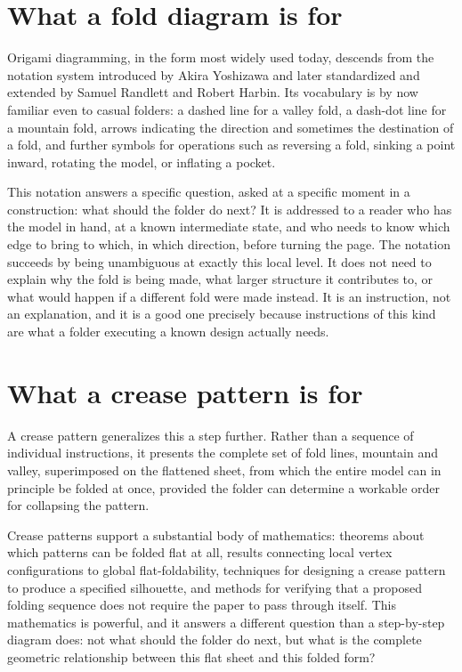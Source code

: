 \documentclass[11pt,oneside]{book}
\begin{document}
\hypertarget{what-a-fold-diagram-is-for}{%
\section{What a fold diagram is
for}\label{what-a-fold-diagram-is-for}}

Origami diagramming, in the form most widely used today, descends from
the notation system introduced by Akira Yoshizawa and later standardized
and extended by Samuel Randlett and Robert Harbin. Its vocabulary is by
now familiar even to casual folders: a dashed line for a valley fold, a
dash-dot line for a mountain fold, arrows indicating the direction and
sometimes the destination of a fold, and further symbols for operations
such as reversing a fold, sinking a point inward, rotating the model, or
inflating a pocket.

This notation answers a specific question, asked at a specific moment in
a construction: what should the folder do next? It is addressed to a
reader who has the model in hand, at a known intermediate state, and who
needs to know which edge to bring to which, in which direction, before
turning the page. The notation succeeds by being unambiguous at exactly
this local level. It does not need to explain why the fold is being
made, what larger structure it contributes to, or what would happen if a
different fold were made instead. It is an instruction, not an
explanation, and it is a good one precisely because instructions of this
kind are what a folder executing a known design actually needs.

\hypertarget{what-a-crease-pattern-is-for}{%
\section{What a crease pattern is
for}\label{what-a-crease-pattern-is-for}}

A crease pattern generalizes this a step further. Rather than a sequence
of individual instructions, it presents the complete set of fold lines,
mountain and valley, superimposed on the flattened sheet, from which the
entire model can in principle be folded at once, provided the folder can
determine a workable order for collapsing the pattern.

Crease patterns support a substantial body of mathematics: theorems
about which patterns can be folded flat at all, results connecting local
vertex configurations to global flat-foldability, techniques for
designing a crease pattern to produce a specified silhouette, and
methods for verifying that a proposed folding sequence does not require
the paper to pass through itself. This mathematics is powerful, and it
answers a different question than a step-by-step diagram does: not what
should the folder do next, but what is the complete geometric
relationship between this flat sheet and this folded form?
\end{document}
